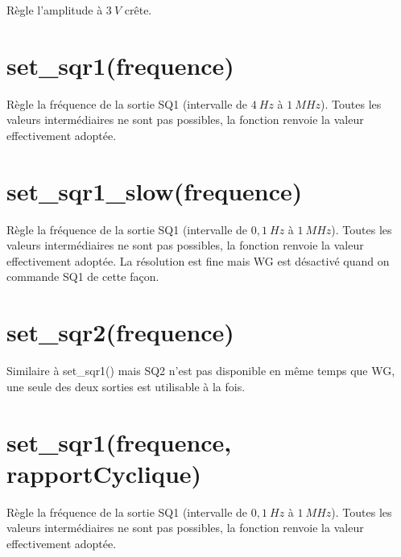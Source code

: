 \documentclass[a4paper,12pt,french]{sphinxmanual}
\begin{document}
\begin{sphinxVerbatim}[commandchars=\\\{\}]
\end{sphinxVerbatim}

Règle l’amplitude à \(3~V\) crête.


\section{set\_sqr1(frequence)}
\label{\detokenize{7.1:set-sqr1-frequence}}
Règle la fréquence de la sortie SQ1 (intervalle de \(4~Hz\) à \(1~MHz\)).
Toutes les valeurs intermédiaires ne sont pas possibles, la fonction
renvoie la valeur effectivement adoptée.

\begin{sphinxVerbatim}[commandchars=\\\{\}]
 
\end{sphinxVerbatim}



\section{set\_sqr1\_slow(frequence)}
\label{\detokenize{7.1:set-sqr1-slow-frequence}}
Règle la fréquence de la sortie SQ1 (intervalle de \(0,1~Hz\) à \(1~MHz\)).
Toutes les valeurs intermédiaires ne sont pas possibles, la fonction
renvoie la valeur effectivement adoptée. La résolution est fine mais
WG est désactivé quand on commande SQ1 de cette façon.

\begin{sphinxVerbatim}[commandchars=\\\{\}]
 
\end{sphinxVerbatim}


\section{set\_sqr2(frequence)}
\label{\detokenize{7.1:set-sqr2-frequence}}
Similaire à set\_sqr1() mais SQ2 n’est pas disponible en même temps
que WG, une seule des deux sorties est utilisable à la fois.


\section{set\_sqr1(frequence, rapportCyclique)}
\label{\detokenize{7.1:set-sqr1-frequence-rapportcyclique}}
Règle la fréquence de la sortie SQ1 (intervalle de \(0,1~Hz\) à \(1~MHz\)).
Toutes les valeurs intermédiaires ne sont pas possibles, la fonction
renvoie la valeur effectivement adoptée.
\end{document}
